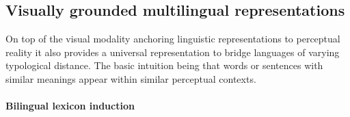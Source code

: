 
\subsection{Visually grounded multilingual representations}
On top of the visual modality anchoring linguistic representations to perceptual reality it
also provides a universal representation to bridge languages of varying typological distance.
The basic intuition being that words or sentences with similar meanings appear
within similar perceptual contexts.

\paragraph{Bilingual lexicon induction}

